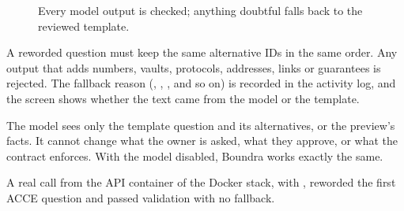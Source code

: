 \begin{figure}[htbp]
\centering
{}
\caption{Every model output is checked; anything doubtful falls back to the reviewed template.}
\end{figure}

A reworded question must keep the same alternative IDs in the same order. Any output that adds numbers, vaults, protocols, addresses, links or guarantees is rejected. The fallback reason (, , ,  and so on) is recorded in the activity log, and the screen shows whether the text came from the model or the template.

\begin{keypoint}
The model sees only the template question and its alternatives, or the preview's facts. It cannot change what the owner is asked, what they approve, or what the contract enforces. With the model disabled, Boundra works exactly the same.
\end{keypoint}

\begin{note}
A real call from the API container of the Docker stack, with , reworded the first ACCE question and passed validation with no fallback.
\end{note}
